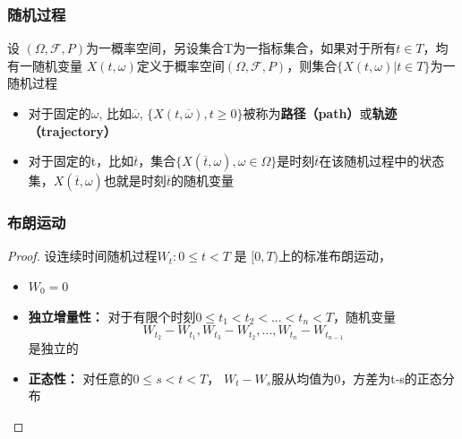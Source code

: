 \documentclass{ctexbeamer}
\begin{document}
   \begin{frame}

        \frametitle{随机过程}

        \begin{definition}[随机过程]

            设 $(\Omega ,{\mathcal  {F}},P)$为一概率空间，另设集合T为一指标集合，如果对于所有$t\in T$，均有一随机变量 $X(t,\omega)$定义于概率空间$(\Omega ,{\mathcal  {F}},P)$，则集合$\{X(t,\omega)|t\in T\}$为一随机过程

        \begin{itemize}

         \item 对于固定的$\omega$, 比如$\overline{\omega}$, $\{X(t,\overline{\omega}), t \geq 0\}$被称为\textbf{路径（path）}或\textbf{轨迹（trajectory）}

         \item 对于固定的t，比如$\overline{t}$，集合$\{X(\overline{t},\omega), \omega \in \Omega\}$是时刻$\overline{t}$在该随机过程中的状态集，$X(\overline{t},\omega)$也就是时刻$\overline{t}$的随机变量


        \end{itemize}

        \end{definition}

    \end{frame}

	\begin{frame}

		\frametitle{布朗运动}	

		\begin{proof}
	
		设连续时间随机过程$W_t: 0 \leq t < T$ 是 $[0,T)$上的标准布朗运动，

			\begin{itemize}

			 \item $W_0 = 0$

			 \item \textbf{独立增量性：} 对于有限个时刻$0 \leq t_1 < t_2 < ... < t_n < T$，随机变量$$W_{t_2}-W_{t_1},W_{t_3}-W_{t_2},...,W_{t_n}-W_{t_{n-1}}$$是独立的

			 \item \textbf{正态性：} 对任意的$0 \leq s < t < T$， $W_t-W_s$服从均值为0，方差为t-s的正态分布

			\end{itemize}

		\end{proof}

	\end{frame}
\end{document}
